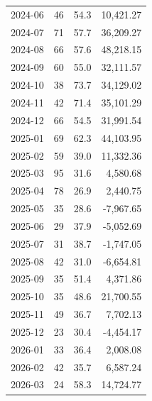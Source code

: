 \documentclass[11pt,a4paper,twoside]{article}
\begin{document}
\begin{center}
\begin{tabular}{>{\color{txtmain}}l rrr}
2024-06 & 46 & 54.3 & \textcolor{wingreen}{10,421.27} \\
2024-07 & 71 & 57.7 & \textcolor{wingreen}{36,209.27} \\
2024-08 & 66 & 57.6 & \textcolor{wingreen}{48,218.15} \\
2024-09 & 60 & 55.0 & \textcolor{wingreen}{32,111.57} \\
2024-10 & 38 & 73.7 & \textcolor{wingreen}{34,129.02} \\
2024-11 & 42 & 71.4 & \textcolor{wingreen}{35,101.29} \\
2024-12 & 66 & 54.5 & \textcolor{wingreen}{31,991.54} \\
2025-01 & 69 & 62.3 & \textcolor{wingreen}{44,103.95} \\
2025-02 & 59 & 39.0 & \textcolor{wingreen}{11,332.36} \\
2025-03 & 95 & 31.6 & \textcolor{wingreen}{4,580.68} \\
2025-04 & 78 & 26.9 & \textcolor{wingreen}{2,440.75} \\
2025-05 & 35 & 28.6 & \textcolor{lossred}{-7,967.65} \\
2025-06 & 29 & 37.9 & \textcolor{lossred}{-5,052.69} \\
2025-07 & 31 & 38.7 & \textcolor{lossred}{-1,747.05} \\
2025-08 & 42 & 31.0 & \textcolor{lossred}{-6,654.81} \\
2025-09 & 35 & 51.4 & \textcolor{wingreen}{4,371.86} \\
2025-10 & 35 & 48.6 & \textcolor{wingreen}{21,700.55} \\
2025-11 & 49 & 36.7 & \textcolor{wingreen}{7,702.13} \\
2025-12 & 23 & 30.4 & \textcolor{lossred}{-4,454.17} \\
2026-01 & 33 & 36.4 & \textcolor{wingreen}{2,008.08} \\
2026-02 & 42 & 35.7 & \textcolor{wingreen}{6,587.24} \\
2026-03 & 24 & 58.3 & \textcolor{wingreen}{14,724.77} \\
\bottomrule
\end{tabular}
\end{center}
\end{document}
